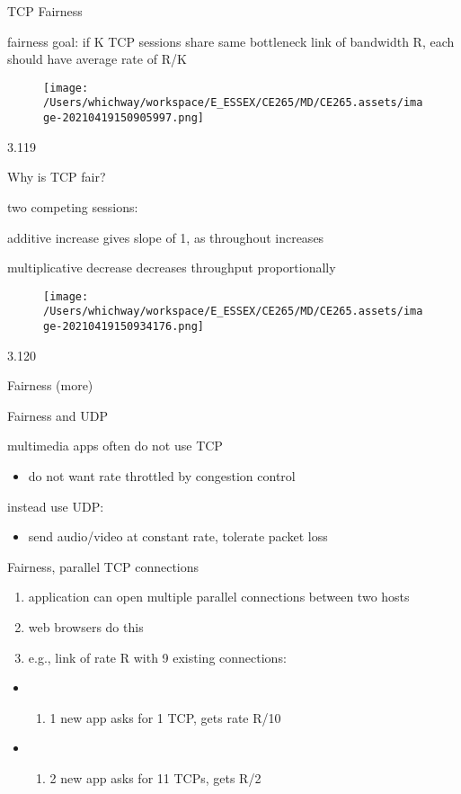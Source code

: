 \documentclass[
]{article}
\begin{document}
TCP Fairness

fairness goal: if K TCP sessions share same bottleneck link of bandwidth
R, each should have average rate of R/K

\begin{figure}
\centering
\texttt{[image: /Users/whichway/workspace/E\_ESSEX/CE265/MD/CE265.assets/image-20210419150905997.png]}
\caption{}
\end{figure}

3.119

Why is TCP fair?

two competing sessions:

additive increase gives slope of 1, as throughout increases

multiplicative decrease decreases throughput proportionally

\begin{figure}
\centering
\texttt{[image: /Users/whichway/workspace/E\_ESSEX/CE265/MD/CE265.assets/image-20210419150934176.png]}
\caption{}
\end{figure}

3.120

Fairness (more)

Fairness and UDP

multimedia apps often do not use TCP

\begin{itemize}
\item
  do not want rate throttled by congestion control
\end{itemize}

instead use UDP:

\begin{itemize}
\item
  send audio/video at constant rate, tolerate packet loss
\end{itemize}

Fairness, parallel TCP connections

\begin{enumerate}
\def\labelenumi{\arabic{enumi}.}
\item
  application can open multiple parallel connections between two hosts
\item
  web browsers do this
\item
  e.g., link of rate R with 9 existing connections:
\end{enumerate}

\begin{itemize}
\item
  \begin{enumerate}
  \def\labelenumi{\arabic{enumi}.}
  \item
    1 new app asks for 1 TCP, gets rate R/10
  \end{enumerate}
\item
  \begin{enumerate}
  \def\labelenumi{\arabic{enumi}.}
  \item
    2 new app asks for 11 TCPs, gets R/2
  \end{enumerate}
\end{itemize}
\end{document}

